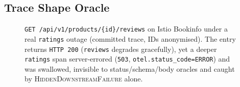 \documentclass[sigconf,screen,review]{acmart}
\begin{document}
\subsection{Trace Shape Oracle}\label{sec:traceoracle}

\begin{figure}[!ht]
  \centering
  \resizebox{\textwidth}{!}{}
  \caption{\texttt{GET /api/v1/products/\{id\}/reviews} on Istio Bookinfo under a real \texttt{ratings} outage (committed trace, IDs anonymised). The entry returns \texttt{HTTP 200} (\texttt{reviews} degrades gracefully), yet a deeper \texttt{ratings} span server-errored (\texttt{503}, \texttt{otel.status\_code=ERROR}) and was swallowed, invisible to status/schema/body oracles and caught by \textsc{HiddenDownstreamFailure} alone.}
  \label{fig:trace}
\end{figure}
\end{document}
